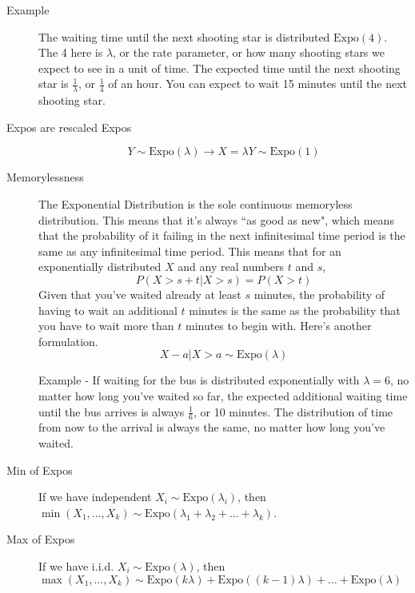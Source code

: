 \documentclass[10pt,landscape]{article}
\theoremstyle{definition}
\newcommand{\Expo}{\textrm{Expo}}
\begin{document}
\begin{multicols}{3}
\begin{description}
    \item[Example] The waiting time until the next shooting star is distributed $\Expo(4)$. The 4 here is $\lambda$, or the rate parameter, or how many shooting stars we expect to see in a unit of time. The expected time until the next shooting star is $\frac{1}{\lambda}$, or $\frac{1}{4}$ of an hour. You can expect to wait 15 minutes until the next shooting star.
    
    \item[Expos are rescaled Expos]
        \[Y \sim \Expo(\lambda) \rightarrow X = \lambda Y \sim \Expo(1)\]
     
    
    \item[Memorylessness] The Exponential Distribution is the sole continuous memoryless distribution. This means that it's always ``as good as new", which means that the probability of it failing in the next infinitesimal time period is the same as any infinitesimal time period. This means that for an exponentially distributed $X$ and any real numbers $t$ and $s$,
    \[P(X > s + t | X > s) = P(X > t)\]
    Given that you've waited already at least $s$ minutes, the probability of having to wait an additional $t$ minutes is the same as the probability that you have to wait more than $t$ minutes to begin with. Here's another formulation.
    \[X - a | X > a \sim \Expo(\lambda)\]

    Example - If waiting for the bus is distributed exponentially with $\lambda = 6$, no matter how long you've waited so far, the expected additional waiting time until the bus arrives is always $\frac{1}{6}$, or 10 minutes. The distribution of time from now to the arrival is always the same, no matter how long you've waited.

    \item[Min of Expos] If we have independent $X_i \sim \Expo(\lambda_i)$, then $\min(X_1, \dots, X_k) \sim \Expo(\lambda_1 + \lambda_2 + \dots + \lambda_k)$. 
    \item[Max of Expos] If we have i.i.d. $X_i \sim \Expo(\lambda)$, then $\max(X_1, \dots, X_k) \sim \Expo(k\lambda) + \Expo((k-1)\lambda) + \dots + \Expo(\lambda)$
    

\end{description}


\end{multicols}
\end{document}
